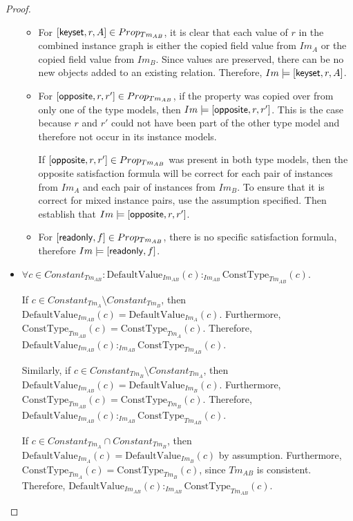 \begin{proof}
\begin{itemize}
\begin{itemize}
        \item For $[ \mathsf{keyset}, r, A ] \in Prop_{Tm_{AB}}$, it is clear that each value of $r$ in the combined instance graph is either the copied field value from $Im_{A}$ or the copied field value from $Im_{B}$. Since values are preserved, there can be no new objects added to an existing relation. Therefore, $Im \models [ \mathsf{keyset}, r, A ]$.
        
        \item For $[ \mathsf{opposite}, r, r' ] \in Prop_{Tm_{AB}}$, if the property was copied over from only one of the type models, then $Im \models [ \mathsf{opposite}, r, r' ]$. This is the case because $r$ and $r'$ could not have been part of the other type model and therefore not occur in its instance models.
        
        If $[ \mathsf{opposite}, r, r' ] \in Prop_{Tm_{AB}}$ was present in both type models, then the opposite satisfaction formula will be correct for each pair of instances from $Im_{A}$ and each pair of instances from $Im_{B}$. To ensure that it is correct for mixed instance pairs, use the assumption specified. Then establish that $Im \models [ \mathsf{opposite}, r, r' ]$.
        
        \item For $[ \mathsf{readonly}, f ] \in Prop_{Tm_{AB}}$, there is no specific satisfaction formula, therefore $Im \models [ \mathsf{readonly}, f ]$.
    \end{itemize}
    
    
    \item $\forall c \in Constant_{Tm_{AB}}\!: \mathrm{DefaultValue}_{Im_{AB}}(c):_{Im_{AB}} \mathrm{ConstType}_{Tm_{AB}}(c)$.
    
    If $c \in Constant_{Tm_A} \setminus Constant_{Tm_B}$, then $\mathrm{DefaultValue}_{Im_{AB}}(c) = \mathrm{DefaultValue}_{Im_{A}}(c)$. Furthermore, $\mathrm{ConstType}_{Tm_{AB}}(c) = \mathrm{ConstType}_{Tm_{A}}(c)$. Therefore, \\$\mathrm{DefaultValue}_{Im_{AB}}(c):_{Im_{AB}} \mathrm{ConstType}_{Tm_{AB}}(c)$.
    
    Similarly, if $c \in Constant_{Tm_B} \setminus Constant_{Tm_A}$, then $\mathrm{DefaultValue}_{Im_{AB}}(c) = \mathrm{DefaultValue}_{Im_{B}}(c)$. Furthermore, $\mathrm{ConstType}_{Tm_{AB}}(c) = \mathrm{ConstType}_{Tm_{B}}(c)$. Therefore, \\$\mathrm{DefaultValue}_{Im_{AB}}(c):_{Im_{AB}} \mathrm{ConstType}_{Tm_{AB}}(c)$.
    
    If $c \in Constant_{Tm_A} \cap Constant_{Tm_B}$, then $\mathrm{DefaultValue}_{Im_{A}}(c) = \mathrm{DefaultValue}_{Im_{B}}(c)$ by assumption. Furthermore, $\mathrm{ConstType}_{Tm_{A}}(c) = \mathrm{ConstType}_{Tm_{B}}(c)$, since $Tm_{AB}$ is consistent. Therefore, $\mathrm{DefaultValue}_{Im_{AB}}(c):_{Im_{AB}} \mathrm{ConstType}_{Tm_{AB}}(c)$.
    

\end{itemize}
\end{proof}
